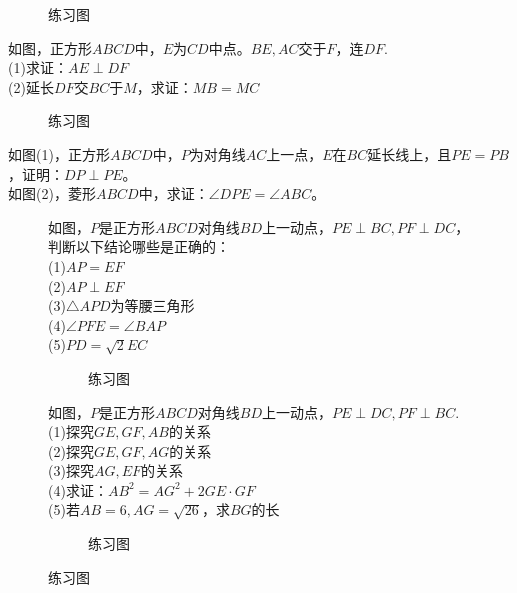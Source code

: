 \begin{figure}[H]
    \centering
    \resizebox{6cm}{!}{}
    \caption{练习图}
\end{figure}
\begin{problem}
如图，正方形$ABCD$中，$E$为$CD$中点。$BE,AC$交于$F$，连$DF$.\\
(1)求证：$AE\perp DF$ \\
(2)延长$DF$交$BC$于$M$，求证：$MB=MC$
\end{problem}
\begin{figure}[H]
    \centering
    \resizebox{3cm}{!}{}
    \caption{练习图}
\end{figure}
\begin{problem}
如图(1)，正方形$ABCD$中，$P$为对角线$AC$上一点，$E$在$BC$延长线上，且$PE=PB$，证明：$DP\perp PE$。\\
如图(2)，菱形$ABCD$中，求证：$\angle DPE=\angle ABC$。\\
\end{problem}
\begin{figure}[H]
    \centering
    \resizebox{6cm}{!}{}
    \caption{练习图}
    \begin{problem}
    如图，$P$是正方形$ABCD$对角线$BD$上一动点，$PE\perp BC,PF\perp DC$，判断以下结论哪些是正确的：\\
    (1)$AP=EF$ \\
    (2)$AP\perp EF$ \\
    (3)$\triangle APD$为等腰三角形 \\
    (4)$\angle PFE=\angle BAP$ \\
    (5)$PD=\sqrt2 EC$ \\
    \end{problem}
    \begin{figure}[H]
        \centering
        \resizebox{3cm}{!}{}
        \caption{练习图}
    \end{figure}
    \begin{problem}
    如图，$P$是正方形$ABCD$对角线$BD$上一动点，$PE\perp DC,PF\perp BC$.\\
    (1)探究$GE,GF,AB$的关系\\
    (2)探究$GE,GF,AG$的关系\\
    (3)探究$AG,EF$的关系\\
    (4)求证：$AB^2=AG^2+2GE·GF$\\
    (5)若$AB=6,AG=\sqrt{26}$，求$BG$的长\\
    \end{problem}
    \begin{figure}[H]
        \centering
        \resizebox{4cm}{!}{}
        \caption{练习图}
    \end{figure}
\end{figure}
\clearpage
